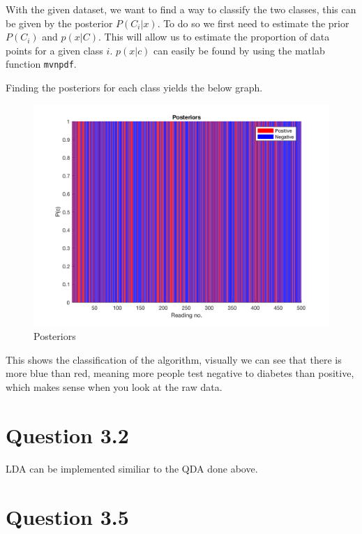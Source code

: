 With the given dataset, we want to find a way to classify the two classes, this can be given by the posterior $P(C_i|x)$. To do so we first need to estimate the prior $P(C_i)$ and $p(x|C)$. This will allow us to estimate the proportion of data points for a given class $i$.  $p(x|c)$ can easily be found by using the matlab function \texttt{mvnpdf}.

Finding the posteriors for each class yields the below graph.

\begin{figure}[H]
    \includegraphics[width=\linewidth]{../../pracs/week4/images/q1_posteriors}
    \centering
    \caption{Posteriors}
\end{figure}

This shows the classification of the algorithm, visually we can see that there is more blue than red, meaning more people test negative to diabetes than positive, which makes sense when you look at the raw data.



\section*{Question 3.2}


LDA can be implemented similiar to the QDA done above.




\section*{Question 3.5}

